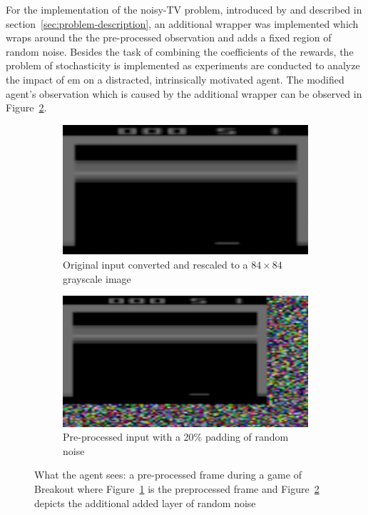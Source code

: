 \documentclass[draft,final]{vutinfth} %
\begin{document}
    For the implementation of the noisy-TV problem, introduced by \citeauthor{schmidhuber_formal_2010} and described in section~\ref{sec:problem-description}, an additional wrapper was implemented which wraps around the the pre-processed observation and adds a fixed region of random noise.
    Besides the task of combining the coefficients of the rewards, the problem of stochasticity is implemented as experiments are conducted to analyze the impact of \gls{em} on a distracted, intrinsically motivated agent.
    The modified agent's observation which is caused by the additional wrapper can be observed in Figure~\ref{fig:tv_noise}.

    \begin{figure}[h]
        \centering
        \begin{subfigure}{.40\textwidth}
            \centering
            \includegraphics[width=.9\linewidth]{figures/TV.PNG}
            \caption{Original input converted and rescaled to a $84 \times 84$ grayscale image}
            \label{fig:tv}
        \end{subfigure}%
        \hspace{0.05\textwidth}
        \begin{subfigure}{.40\textwidth}
            \centering
            \includegraphics[width=.9\linewidth]{figures/TV_noise.PNG}
            \caption{Pre-processed input with a 20\% padding of random noise}
            \label{fig:tv_noise}
        \end{subfigure}
        \caption[What the agent sees: a pre-processed frame during a game of Breakout]{What the agent sees: a pre-processed frame during a game of Breakout where Figure~\ref{fig:tv} is the preprocessed frame and Figure~\ref{fig:tv_noise} depicts the additional added layer of random noise}
        \label{fig:observation}
    \end{figure}
\end{document}
